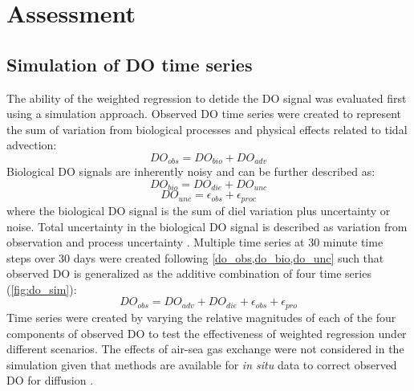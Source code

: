 \documentclass[letterpaper,12pt,oneside]{article}\usepackage[]{graphicx}\usepackage[]{color}
\begin{document}
\section{Assessment}

\subsection{Simulation of \ac{DO} time series}

The ability of the weighted regression to detide the \ac{DO} signal was evaluated first using a simulation approach.  Observed \ac{DO} time series were created to represent the sum of variation from biological processes and physical effects related to tidal advection:  
\begin{equation} \label{do_obs}
DO_{obs} = DO_{bio} + DO_{adv}
\end{equation}
Biological \ac{DO} signals are inherently noisy \citep{Batt12} and can be further described as:
\begin{equation} \label{do_bio} 
DO_{bio} = DO_{die} + DO_{unc}
\end{equation} 
\begin{equation} \label{do_unc}
DO_{unc} = \epsilon_{obs} + \epsilon_{proc}
\end{equation}
where the biological \ac{DO} signal is the sum of diel variation plus uncertainty or noise.  Total uncertainty in the biological \ac{DO} signal is described as variation from observation and process uncertainty \citep{Hilborn97}.  Multiple time series at 30 minute time steps over 30 days were created following \cref{do_obs,do_bio,do_unc} such that observed \ac{DO} is generalized as the additive combination of four time series (\cref{fig:do_sim}):
\begin{equation} \label{do_obs_all}
DO_{obs} = DO_{adv} + DO_{die} + \epsilon_{obs} + \epsilon_{pro}
\end{equation}
Time series were created by varying the relative magnitudes of each of the four components of observed \ac{DO} to test the effectiveness of weighted regression under different scenarios.  The effects of air-sea gas exchange were not considered in the simulation given that methods are available for \textit{in situ} data to correct observed \ac{DO} for diffusion \citep[i.e., ][]{Thebault08}.  
\end{document}
